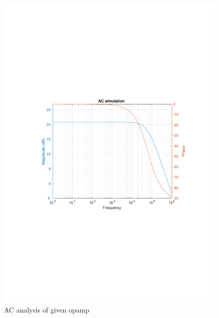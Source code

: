 \documentclass[12pt,a4paper,UKenglish]{article}
\begin{document}
\begin{figure} [htbp]
  \centering 
  \includegraphics[width=\textwidth]{img/1b.pdf} 
  \caption{AC analysis of given opamp}
  \label{ac_ana} 
\end{figure}

\end{document}

